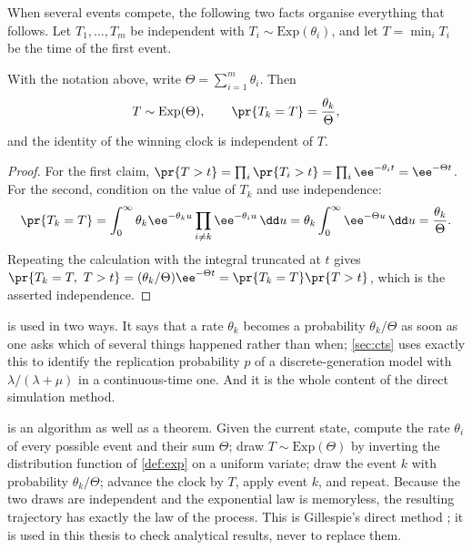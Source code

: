 When several events compete, the following two facts organise everything that
follows. Let $T_1,\dots,T_m$ be independent with $T_i\sim\mathrm{Exp}(\theta_i)$,
and let $T = \min_i T_i$ be the time of the first event.

\begin{proposition}
\label{prop:race}
With the notation above, write $\Theta = \sum_{i=1}^m\theta_i$. Then
\begin{equation}
\label{eq:race}
T \sim \mathrm{Exp}(\Theta),
\qquad
\pr{T_k = T} = \frac{\theta_k}{\Theta},
\end{equation}
and the identity of the winning clock is independent of $T$.
\end{proposition}

\begin{proof}
For the first claim,
$\pr{T>t} = \prod_i\pr{T_i>t} = \prod_i\ee^{-\theta_i t} = \ee^{-\Theta t}$.
For the second, condition on the value of $T_k$ and use independence:
\begin{equation*}
\pr{T_k = T}
= \int_0^\infty \theta_k\ee^{-\theta_k u}\prod_{i\neq k}\ee^{-\theta_i u}\,\dd u
= \theta_k\int_0^\infty \ee^{-\Theta u}\,\dd u
= \frac{\theta_k}{\Theta}.
\end{equation*}
Repeating the calculation with the integral truncated at $t$ gives
$\pr{T_k=T,\ T>t} = (\theta_k/\Theta)\ee^{-\Theta t}
= \pr{T_k=T}\pr{T>t}$, which is the asserted independence.
\end{proof}

 is used in two ways. It says that a rate $\theta_k$ becomes a
probability $\theta_k/\Theta$ as soon as one asks which of several things happened
rather than when; \cref{sec:cts} uses exactly this to identify the replication
probability $p$ of a discrete-generation model with $\lambda/(\lambda+\mu)$ in a
continuous-time one. And it is the whole content of the direct simulation method.

\begin{remark}
\label{rem:gillespie}
 is an algorithm as well as a theorem. Given the current state,
compute the rate $\theta_i$ of every possible event and their sum $\Theta$; draw
$T\sim\mathrm{Exp}(\Theta)$ by inverting the distribution function of
\cref{def:exp} on a uniform variate; draw the event $k$ with probability
$\theta_k/\Theta$; advance the clock by $T$, apply event $k$, and repeat. Because
the two draws are independent and the exponential law is memoryless, the resulting
trajectory has exactly the law of the process. This is Gillespie's direct method
\cite{Gillespie1977}; it is used in this thesis to check analytical results, never
to replace them.
\end{remark}

